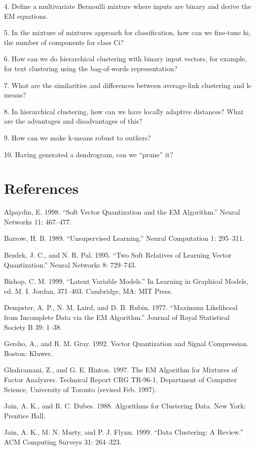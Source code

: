 4. Define a multivariate Bernoulli mixture where inputs are binary and derive the EM equations.

5. In the mixture of mixtures approach for classification, how can we fine-tune ki, the number of components for class Ci?

6. How can we do hierarchical clustering with binary input vectors, for example, for text clustering using the bag-of-words representation?

7. What are the similarities and differences between average-link clustering and k-means?

8. In hierarchical clustering, how can we have locally adaptive distances? What are the advantages and disadvantages of this?

9. How can we make k-means robust to outliers?

10. Having generated a dendrogram, can we “prune” it?

\section{References}

Alpaydin, E. 1998. “Soft Vector Quantization and the EM Algorithm.” Neural Networks 11: 467--477.

Barrow, H. B. 1989. “Unsupervised Learning.” Neural Computation 1: 295--311.

Bezdek, J. C., and N. R. Pal. 1995. “Two Soft Relatives of Learning Vector Quantization.” Neural Networks 8: 729--743.

Bishop, C. M. 1999. “Latent Variable Models.” In Learning in Graphical Models, ed. M. I. Jordan, 371--403. Cambridge, MA: MIT Press.

Dempster, A. P., N. M. Laird, and D. B. Rubin. 1977. “Maximum Likelihood from Incomplete Data via the EM Algorithm.” Journal of Royal Statistical Society B 39: 1--38.

Gersho, A., and R. M. Gray. 1992. Vector Quantization and Signal Compression. Boston: Kluwer.

Ghahramani, Z., and G. E. Hinton. 1997. The EM Algorithm for Mixtures of Factor Analyzers. Technical Report CRG TR-96-1, Department of Computer Science, University of Toronto (revised Feb. 1997).

Jain, A. K., and R. C. Dubes. 1988. Algorithms for Clustering Data. New York: Prentice Hall.

Jain, A. K., M. N. Murty, and P. J. Flynn. 1999. “Data Clustering: A Review.” ACM Computing Surveys 31: 264--323.

